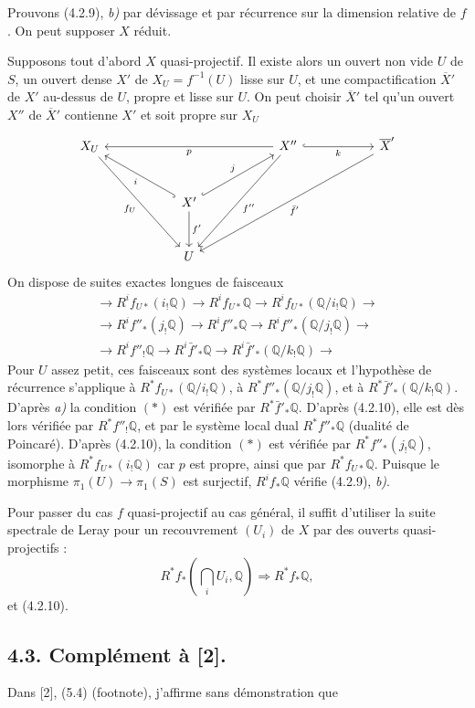 \documentclass[10pt]{article}
\newcommand{\Q}{\mathbb Q}
\begin{document}
Prouvons (4.2.9), \textit{b)} par dévissage et par récurrence sur la dimension relative de $f$. On peut supposer $X$ réduit.

Supposons tout d'abord $X$ quasi-projectif. Il existe alors un ouvert non vide $U$ de $S$, un ouvert dense $X'$ de $X_U=f^{-1}(U)$ lisse sur $U$, et une compactification $\overline X'$ de $X'$ au-dessus de $U$, propre et lisse sur $U$. On peut choisir $\overline X'$ tel qu'un ouvert $X''$ de $\overline X'$ contienne $X'$ et soit propre sur $X_U$
\[
\begin{tikzcd}[column sep=2.8em,row sep=2.8em]
X_U \arrow[ddrr,"f_U"'] &&&&
X'' \arrow[llll,"p"] \arrow[rr,hook,"k"'] \arrow[ddll,"f''"] &&
\overline X' \arrow[ddllll,"\bar f'"] \\
&& X' \arrow[ull,hook,"i"] \arrow[urr,hook,"j"] \arrow[d,"f'"] &&&& \\
&& U &&&&
\end{tikzcd}
\]
On dispose de suites exactes longues de faisceaux
\[
\begin{gathered}
\to R^if_{U*}(i_!\Q)\to R^if_{U*}\Q\to R^if_{U*}(\Q/i_!\Q)\to\\
\to R^if''_*(j_!\Q)\to R^if''_*\Q\to R^if''_*(\Q/j_!\Q)\to\\
\to R^if''_!\Q\to R^i\bar f'_*\Q\to R^i\bar f'_*(\Q/k_!\Q)\to
\end{gathered}
\]
Pour $U$ assez petit, ces faisceaux sont des systèmes locaux et l'hypothèse de récurrence s'applique à $R^*f_{U*}(\Q/i_!\Q)$, à $R^*f''_*(\Q/j_!\Q)$, et à $R^*\bar f'_*(\Q/k_!\Q)$. D'après \textit{a)} la condition $(*)$ est vérifiée par $R^*\bar f'_*\Q$. D'après (4.2.10), elle est dès lors vérifiée par $R^*f''_!\Q$, et par le système local dual $R^*f''_*\Q$ (dualité de Poincaré). D'après (4.2.10), la condition $(*)$ est vérifiée par $R^*f''_*(j_!\Q)$, isomorphe à $R^*f_{U*}(i_!\Q)$ car $p$ est propre, ainsi que par $R^*f_{U*}\Q$. Puisque le morphisme $\pi_1(U)\to\pi_1(S)$ est surjectif, $R^if_*\Q$ vérifie (4.2.9), \textit{b)}.

Pour passer du cas $f$ quasi-projectif au cas général, il suffit d'utiliser la suite spectrale de Leray pour un recouvrement $(U_i)$ de $X$ par des ouverts quasi-projectifs :
\[
R^*f_*(\bigcap_iU_i,\Q)\Rightarrow R^*f_*\Q,
\]
et (4.2.10).

\subsection*{4.3. Complément à [2].}

Dans [2], (5.4) (footnote), j'affirme sans démonstration que
\end{document}
